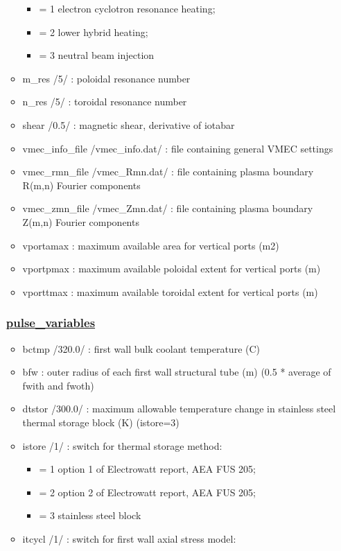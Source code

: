\documentclass[
]{article}
\providecommand{\tightlist}{%
  \setlength{\itemsep}{0pt}\setlength{\parskip}{0pt}}
\begin{document}
\begin{itemize}
\begin{itemize}
    \begin{itemize}
    \tightlist
    \item
      = 1 electron cyclotron resonance heating;
    \item
      = 2 lower hybrid heating;
    \item
      = 3 neutral beam injection
    \end{itemize}
  \item
    m\_res /5/ : poloidal resonance number
  \item
    n\_res /5/ : toroidal resonance number
  \item
    shear /0.5/ : magnetic shear, derivative of iotabar
  \item
    vmec\_info\_file /vmec\_info.dat/ : file containing general VMEC
    settings
  \item
    vmec\_rmn\_file /vmec\_Rmn.dat/ : file containing plasma boundary
    R(m,n) Fourier components
  \item
    vmec\_zmn\_file /vmec\_Zmn.dat/ : file containing plasma boundary
    Z(m,n) Fourier components
  \item
    vportamax : maximum available area for vertical ports (m2)
  \item
    vportpmax : maximum available poloidal extent for vertical ports (m)
  \item
    vporttmax : maximum available toroidal extent for vertical ports (m)
  \end{itemize}

  \hypertarget{pulse_variables}{%
  \subsubsection{\texorpdfstring{\href{pulse_variables.html}{pulse\_variables}}{pulse\_variables}}\label{pulse_variables}}

  \begin{itemize}
  \tightlist
  \item
    bctmp /320.0/ : first wall bulk coolant temperature (C)
  \item
    bfw : outer radius of each first wall structural tube (m) (0.5 *
    average of fwith and fwoth)
  \item
    dtstor /300.0/ : maximum allowable temperature change in stainless
    steel thermal storage block (K) (istore=3)
  \item
    istore /1/ : switch for thermal storage method:

    \begin{itemize}
    \tightlist
    \item
      = 1 option 1 of Electrowatt report, AEA FUS 205;
    \item
      = 2 option 2 of Electrowatt report, AEA FUS 205;
    \item
      = 3 stainless steel block
    \end{itemize}
  \item
    itcycl /1/ : switch for first wall axial stress model:


\end{itemize}
\end{itemize}
\end{document}

